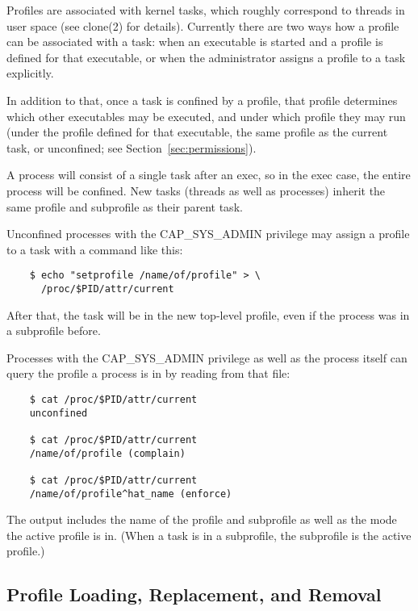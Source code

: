 \documentclass[a4paper]{article}
\renewcommand{\H}{\hspace{0pt}}
\begin{document}
Profiles are associated with kernel tasks, which roughly correspond to
threads in user space (see clone(2) for details).  Currently there are
two ways how a profile can be associated with a task: when an executable
is started and a profile is defined for that executable, or when the
administrator assigns a profile to a task explicitly.

In addition to that, once a task is confined by a profile, that profile
determines which other executables may be executed, and under which
profile they may run (under the profile defined for that executable, the
same profile as the current task, or unconfined; see
Section~\ref{sec:permissions}).

A process will consist of a single task after an exec, so in the exec
case, the entire process will be confined.  New tasks (threads as well
as processes) inherit the same profile and subprofile as their parent
task.

Unconfined processes with the CAP\_{\H}SYS\_{\H}ADMIN privilege may assign a
profile to a task with a command like this:

\begin{small}
\begin{verbatim}
    $ echo "setprofile /name/of/profile" > \
      /proc/$PID/attr/current
\end{verbatim}
\end{small}

After that, the task will be in the new top-level profile, even if the
process was in a subprofile before.

Processes with the CAP\_{\H}SYS\_{\H}ADMIN privilege as well as the process itself
can query the profile a process is in by reading from that file:

\begin{small}
\begin{verbatim}
    $ cat /proc/$PID/attr/current
    unconfined

    $ cat /proc/$PID/attr/current
    /name/of/profile (complain)

    $ cat /proc/$PID/attr/current
    /name/of/profile^hat_name (enforce)
\end{verbatim}
\end{small}

The output includes the name of the profile and subprofile as well as
the mode the active profile is in.  (When a task is in a subprofile,
the subprofile is the active profile.)

\subsection{Profile Loading, Replacement, and Removal}
\end{document}
